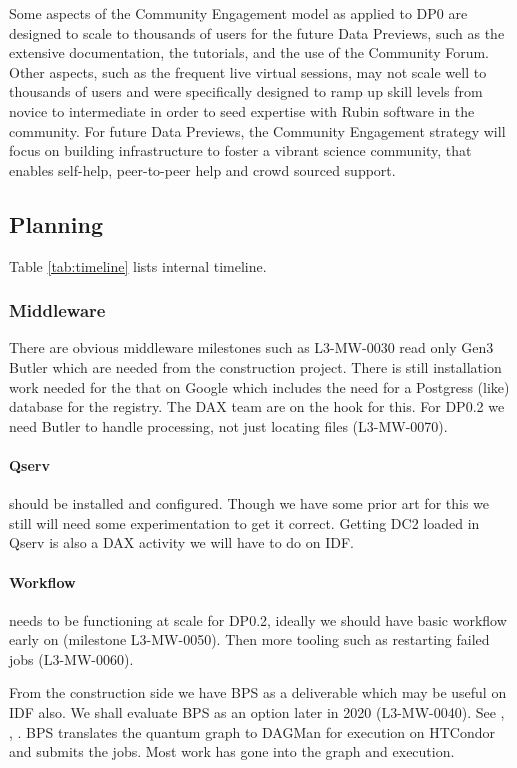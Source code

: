 Some aspects of the Community Engagement model as applied to DP0 are designed to scale to thousands of users for the future Data Previews, such as the extensive documentation, the tutorials, and the use of the Community Forum.
Other aspects, such as the frequent live virtual sessions, may not scale well to thousands of users and were specifically designed to ramp up skill levels from novice to intermediate in order to seed expertise with Rubin software in the community.
For future Data Previews, the Community Engagement strategy will focus on building infrastructure to foster a vibrant science community, that enables self-help, peer-to-peer help and crowd sourced support.

\subsection{Planning}



Table \ref{tab:timeline} lists internal timeline.

\subsubsection{Middleware}
There are obvious middleware milestones such as L3-MW-0030 read only Gen3 Butler which are needed from the construction project.
There is still installation work needed for the that on Google which includes the need for a Postgress (like) database for the registry. The DAX team are on the hook for this.
For DP0.2 we need Butler to handle processing, not just locating files (L3-MW-0070).

\paragraph{Qserv} should be installed  and configured. Though we have some prior art for this we
still will need some experimentation to get it correct. Getting DC2 loaded in Qserv is also a DAX activity
we will have to do on IDF.

\paragraph{Workflow} needs to be functioning at scale for DP0.2, ideally we should have basic workflow
early on (milestone L3-MW-0050). Then more tooling such as restarting failed jobs (L3-MW-0060).

From the construction side we have BPS as a deliverable which may be useful on IDF also.
We shall evaluate BPS as an option later in 2020 (L3-MW-0040).
See , , .
BPS translates the quantum graph to DAGMan for execution on HTCondor and submits the jobs.
Most work has gone into the graph and execution.

